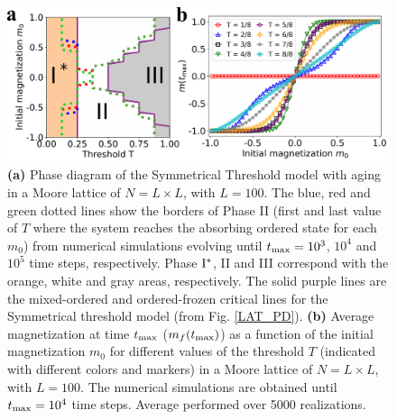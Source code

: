 \begin{figure}
        \centering \captionsetup{font=sf}
        \includegraphics[width=\textwidth]{Figs/Aging_STM/FIG11.pdf}
        \caption[Symmetrical Threshold model with aging in a Moore lattice]{\label{LAT_PDAGING} \textbf{(a)} Phase diagram of the Symmetrical Threshold model with aging in a Moore lattice of $N = L \times L$, with $L = 100$. The blue, red and green dotted lines show the borders of Phase II (first and last value of $T$ where the system reaches the absorbing ordered state for each $m_0$) from numerical simulations evolving until $t_{\rm max} = 10^3$, $10^4$ and $10^5$ time steps, respectively. Phase ${\rm I}^{*}$, II and III correspond with the orange, white and gray areas, respectively. The solid purple lines are the mixed-ordered and ordered-frozen critical lines for the Symmetrical threshold model (from Fig. \ref{LAT_PD}). \textbf{(b)} Average magnetization at time $t_{\rm max}$ ($m_f(t_{\rm max})$) as a function of the initial magnetization $m_0$ for different values of the threshold $T$ (indicated with different colors and markers) in a Moore lattice of $N = L \times L$, with $L = 100$. The numerical simulations are obtained until $t_{\rm max} = 10^4$ time steps. Average performed over 5000 realizations.}
\end{figure}

